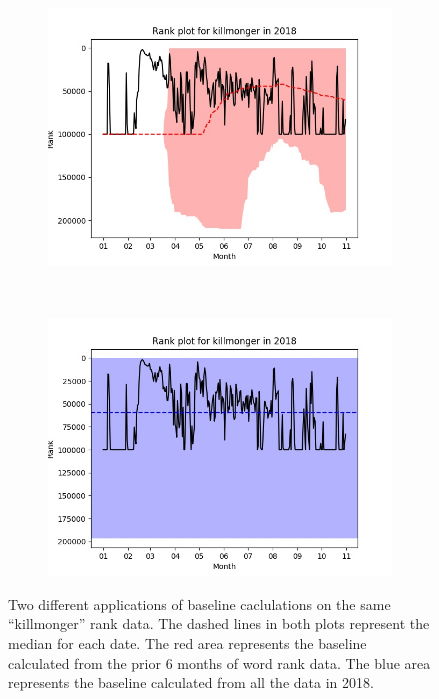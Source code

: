 \documentclass{article}
\begin{document}
\begin{figure}
    \centering
    \begin{subfigure}{0.45\textwidth}
        \includegraphics[width=\textwidth]{killmonger-2018.jpg}
    \end{subfigure}
    ~
    \begin{subfigure}{0.45\textwidth}
        \includegraphics[width=\textwidth]{killmonger-2018-baseline-comparison.jpg}
    \end{subfigure}
    \caption{\label{Fig:killmonger} Two different applications of
    baseline caclulations on the same ``killmonger'' rank data. The dashed lines
    in both plots represent the median for each date. The red area
    represents the baseline calculated from the prior 6 months of word
    rank data.  The blue area represents the baseline calculated from all the
    data in 2018.}
\end{figure}
\end{document}
